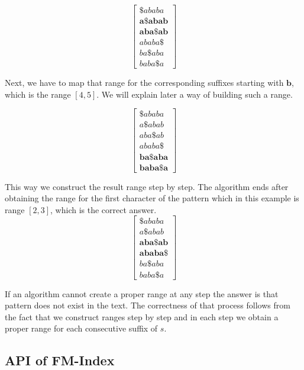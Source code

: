 $$
\begin{bmatrix}
\$ababa\\
\textbf{a\$abab}\\
\textbf{aba\$ab}\\
ababa\$\\
ba\$aba\\
baba\$a
\end{bmatrix}
$$

Next, we have to map that range for the corresponding suffixes starting with $\textbf{b}$, which is the range $[4,5]$. We will explain later a way of building such a range.

$$
\begin{bmatrix}
\$ababa\\
a\$abab\\
aba\$ab\\
ababa\$\\
\textbf{ba\$aba}\\
\textbf{baba\$a}
\end{bmatrix}
$$

This way we construct the result range step by step. The algorithm ends after obtaining the range for the first character of the pattern which in this example is range $[2,3]$, which is the correct answer.
$$
\begin{bmatrix}
\$ababa\\
a\$abab\\
\textbf{aba\$ab}\\
\textbf{ababa\$}\\
ba\$aba\\
baba\$a
\end{bmatrix}
$$

If an algorithm cannot create a proper range at any step the answer is that pattern does not exist in the text. The correctness of that process follows from the fact that we construct ranges step by step and in each step we obtain a proper range for each consecutive suffix of $s$.

\subsection{API of FM-Index}

